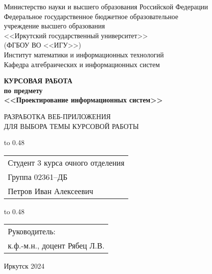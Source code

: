 \thispagestyle{empty}
\begin{center}
Министерство науки и высшего образования Российской Федерации\\
Федеральное государственное бюджетное образовательное\\
учреждение высшего образования\\
<<Иркутский государственный университет>>\\
(ФГБОУ ВО <<ИГУ>>)\\
Институт математики и информационных технологий\\
Кафедра алгебраических и информационных систем\\
\end{center}

\vspace{2.7cm}

\begin{center}
{\bf 
КУРСОВАЯ РАБОТА\\[1mm]
по предмету\\[1mm]
<<Проектирование информационных систем>>
}  

\vspace{0.9cm}

{
РАЗРАБОТКА ВЕБ-ПРИЛОЖЕНИЯ\\[1mm]
ДЛЯ ВЫБОРА ТЕМЫ КУРСОВОЙ РАБОТЫ
}
\end{center}

\vspace{2.3cm}

{
\noindent\hbox to 0.48\textwidth {%
	\mbox{ } \hfil} %
	\begin{tabular}[t]{l}
		Студент 3 курса очного отделения\\
		Группа 02361--ДБ\\
		Петров Иван Алексеевич		
	\end{tabular}		
}

\vspace{1.3cm}

{
\noindent\hbox to 0.48\textwidth {%
	\mbox{ } \hfil} %
	\begin{tabular}[t]{l}
		Руководитель:\\ к.ф.-м.н., доцент Рябец Л.В.		
	\end{tabular}		
}


\vfill 
\noindent
\begin{minipage}{\textwidth}
\centering	 Иркутск 2024
\end{minipage}